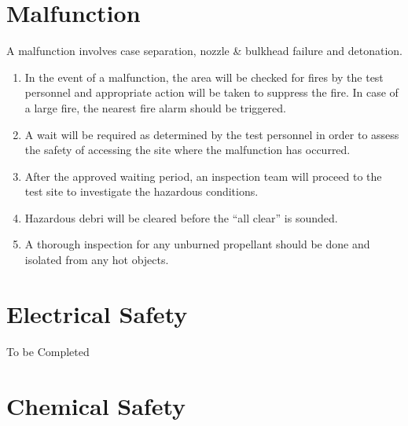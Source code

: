 \documentclass[12pt,letterpaper]{article}
\begin{document}
    \section{Malfunction}
        \noindent A malfunction involves case separation, nozzle \&
        bulkhead failure and detonation.
            \begin{enumerate}
                \begin{enumerate}
                    \item In the event of a malfunction, the area will be
                    checked for fires by the test personnel and appropriate
                    action will be taken to suppress the fire. In case of a
                    large fire, the nearest fire alarm should be triggered.
                    \item A wait will be required as determined by the test
                    personnel in order to assess the safety of accessing the
                    site where the malfunction has occurred.
                    \item After the approved waiting period, an inspection
                    team will proceed to the test site to investigate the
                    hazardous conditions.
                    \item Hazardous debri will be cleared before the
                    “all clear” is sounded.
                    \item A thorough inspection for any unburned propellant
                    should be done and isolated from any hot objects.\cite{dod1962safety}
                \end{enumerate}
            \end{enumerate}
    \section{Electrical Safety}
        \noindent To be Completed
    \section{Chemical Safety}
\end{document}
